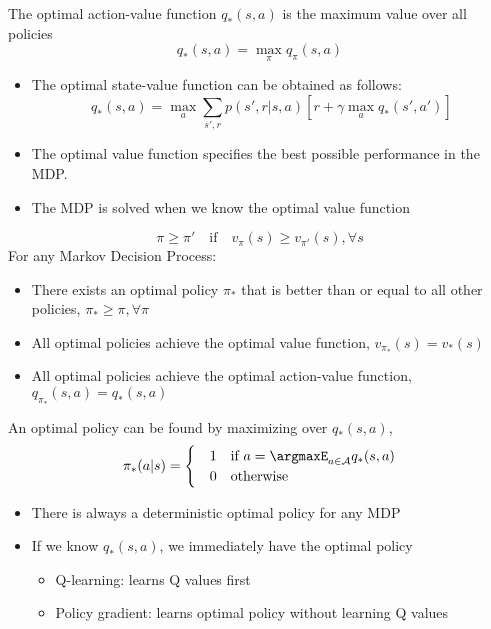 \begin{definition}
	The optimal action-value function $q_{*}(s, a)$ is the maximum value over all policies
	$$q_{*}(s,a) = \max_{\pi} q_{\pi}(s,a)$$
\end{definition}
\begin{itemize}
	\item The optimal state-value function can be obtained as follows:
		$$q_{*}(s,a) = \max_a \sum_{s',r}p(s',r|s,a)[r + \gamma \max_a q_*(s',a')]$$
	\item The optimal value function specifies the best possible performance in the MDP.
	\item The MDP is solved when we know the optimal value function
\end{itemize}

\begin{theorem}
	$$\pi\geq \pi' \quad\textrm{if}\quad v_\pi(s) \geq v_{\pi'}(s), \forall s$$
	For any Markov Decision Process:
	\begin{itemize}
		\item There exists an optimal policy $\pi_*$ that is better than or equal to all other policies, $\pi_*\geq \pi, \forall \pi$
		\item All optimal policies achieve the optimal value function, $v_{\pi_*}(s) = v_*(s)$
		\item All optimal policies achieve the optimal action-value function, $q_{\pi_*}(s,a) = q_{*}(s,a)$
	\end{itemize}
\end{theorem}

An optimal policy can be found by maximizing over $q_*(s,a)$, 
\begin{align*}
	\pi_*(a|s) = 
	\begin{cases} 
		&1 \quad \textrm{if } a = \argmaxE_{a\in \mathcal{A}}q_*(s,a)\\
		&0 \quad \textrm{otherwise}
	\end{cases}
\end{align*}
\begin{itemize}
	\item There is always a deterministic optimal policy for any MDP
	\item If we know $q_*(s,a)$, we immediately have the optimal policy 
		\begin{itemize}
			\item Q-learning: learns Q values first
			\item Policy gradient: learns optimal policy without learning Q values
		\end{itemize}
\end{itemize}

